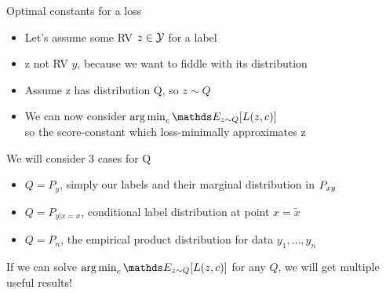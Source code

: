 \documentclass[11pt,compress,t,notes=noshow, xcolor=table]{beamer}
\begin{document}
\begin{vbframe}{Optimal constants for a loss}

\begin{itemize}
\item Let's assume some RV $z \in \mathcal{Y}$ for a label
\item z not RV $y$, because we want to fiddle with its distribution
\item Assume z has distribution Q, so $z \sim Q$
\item We can now consider $\argmin_c \E_{z \sim Q}[L(z, c)]$\\
so the score-constant which loss-minimally approximates z
\end{itemize}

\lz

We will consider 3 cases for Q
\begin{itemize}
\item $Q = P_y$, simply our labels and their marginal distribution in $P_{xy}$
\item $Q = P_{y | x = x}$, conditional label distribution at point $x = \tilde{x}$
\item $Q = P_n$, the empirical product distribution for data $y_1, \ldots, y_n$
\end{itemize}

\lz

If we can solve $\argmin_c \E_{z \sim Q}[L(z, c)]$ for any $Q$,
we will get multiple useful results!


\end{vbframe}
\end{document}
